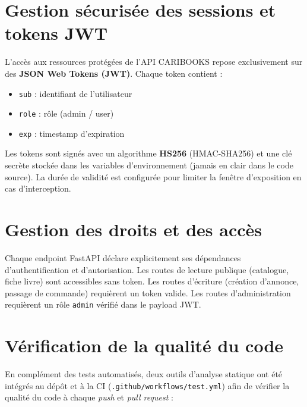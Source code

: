 \documentclass[12pt, a4paper]{report}
\renewcommand{\_}{\origunderscore\allowbreak}
\begin{document}
\section{Gestion sécurisée des sessions et tokens JWT}

L'accès aux ressources protégées de l'API CARIBOOKS repose exclusivement sur des \textbf{JSON Web Tokens (JWT)}. Chaque token contient :
\begin{itemize}
    \item \texttt{sub} : identifiant de l'utilisateur
    \item \texttt{role} : rôle (admin / user)
    \item \texttt{exp} : timestamp d'expiration
\end{itemize}

\noindent Les tokens sont signés avec un algorithme \textbf{HS256} (HMAC-SHA256) et une clé secrète stockée dans les variables d'environnement (jamais en clair dans le code source). La durée de validité est configurée pour limiter la fenêtre d'exposition en cas d'interception.

\section{Gestion des droits et des accès}

Chaque endpoint FastAPI déclare explicitement ses dépendances d'authentification et d'autorisation. Les routes de lecture publique (catalogue, fiche livre) sont accessibles sans token. Les routes d'écriture (création d'annonce, passage de commande) requièrent un token valide. Les routes d'administration requièrent un rôle \texttt{admin} vérifié dans le payload JWT.

\section{Vérification de la qualité du code}

En complément des tests automatisés, deux outils d'analyse statique ont été intégrés au dépôt et
à la CI (\texttt{.github/workflows/test.yml}) afin de vérifier la qualité du code à chaque
\textit{push} et \textit{pull request} :
\end{document}
